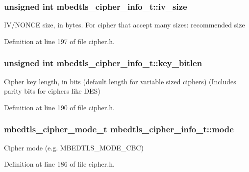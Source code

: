 \hypertarget{structmbedtls__cipher__info__t_a3416bc1e18e1694da17bc922f152b20d}{
\subsubsection[{iv\-\_\-size}]{\setlength{\rightskip}{0pt plus 5cm}unsigned int mbedtls\-\_\-cipher\-\_\-info\-\_\-t\-::iv\-\_\-size}}\label{structmbedtls__cipher__info__t_a3416bc1e18e1694da17bc922f152b20d}
I\-V/\-N\-O\-N\-C\-E size, in bytes. For cipher that accept many sizes\-: recommended size 

Definition at line 197 of file cipher.\-h.

\hypertarget{structmbedtls__cipher__info__t_a21ac3fc6bf536ce16f1754301e7fe3c9}{
\subsubsection[{key\-\_\-bitlen}]{\setlength{\rightskip}{0pt plus 5cm}unsigned int mbedtls\-\_\-cipher\-\_\-info\-\_\-t\-::key\-\_\-bitlen}}\label{structmbedtls__cipher__info__t_a21ac3fc6bf536ce16f1754301e7fe3c9}
Cipher key length, in bits (default length for variable sized ciphers) (Includes parity bits for ciphers like D\-E\-S) 

Definition at line 190 of file cipher.\-h.

\hypertarget{structmbedtls__cipher__info__t_a6603375900f4834ae6c91e305aef34f6}{
\subsubsection[{mode}]{\setlength{\rightskip}{0pt plus 5cm}mbedtls\-\_\-cipher\-\_\-mode\-\_\-t mbedtls\-\_\-cipher\-\_\-info\-\_\-t\-::mode}}\label{structmbedtls__cipher__info__t_a6603375900f4834ae6c91e305aef34f6}
Cipher mode (e.\-g. M\-B\-E\-D\-T\-L\-S\-\_\-\-M\-O\-D\-E\-\_\-\-C\-B\-C) 

Definition at line 186 of file cipher.\-h.

